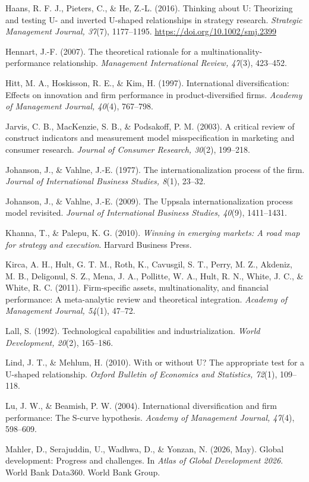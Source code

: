\documentclass[12pt,a4paper]{article}
\begin{document}
Haans, R. F. J., Pieters, C., \& He, Z.-L. (2016). Thinking about U:
Theorizing and testing U- and inverted U-shaped relationships in
strategy research. \emph{Strategic Management Journal, 37}(7),
1177--1195. \url{https://doi.org/10.1002/smj.2399}

Hennart, J.-F. (2007). The theoretical rationale for a
multinationality-performance relationship. \emph{Management
International Review, 47}(3), 423--452.

Hitt, M. A., Hoskisson, R. E., \& Kim, H. (1997). International
diversification: Effects on innovation and firm performance in
product-diversified firms. \emph{Academy of Management Journal, 40}(4),
767--798.

Jarvis, C. B., MacKenzie, S. B., \& Podsakoff, P. M. (2003). A critical
review of construct indicators and measurement model misspecification in
marketing and consumer research. \emph{Journal of Consumer Research,
30}(2), 199--218.

Johanson, J., \& Vahlne, J.-E. (1977). The internationalization process
of the firm. \emph{Journal of International Business Studies, 8}(1),
23--32.

Johanson, J., \& Vahlne, J.-E. (2009). The Uppsala internationalization
process model revisited. \emph{Journal of International Business
Studies, 40}(9), 1411--1431.

Khanna, T., \& Palepu, K. G. (2010). \emph{Winning in emerging markets:
A road map for strategy and execution}. Harvard Business Press.

Kirca, A. H., Hult, G. T. M., Roth, K., Cavusgil, S. T., Perry, M. Z.,
Akdeniz, M. B., Deligonul, S. Z., Mena, J. A., Pollitte, W. A., Hult, R.
N., White, J. C., \& White, R. C. (2011). Firm-specific assets,
multinationality, and financial performance: A meta-analytic review and
theoretical integration. \emph{Academy of Management Journal, 54}(1),
47--72.

Lall, S. (1992). Technological capabilities and industrialization.
\emph{World Development, 20}(2), 165--186.

Lind, J. T., \& Mehlum, H. (2010). With or without U? The appropriate
test for a U-shaped relationship. \emph{Oxford Bulletin of Economics and
Statistics, 72}(1), 109--118.

Lu, J. W., \& Beamish, P. W. (2004). International diversification and
firm performance: The S-curve hypothesis. \emph{Academy of Management
Journal, 47}(4), 598--609.

Mahler, D., Serajuddin, U., Wadhwa, D., \& Yonzan, N. (2026, May).
Global development: Progress and challenges. In \emph{Atlas of Global
Development 2026}. World Bank Data360. World Bank Group.
\end{document}
